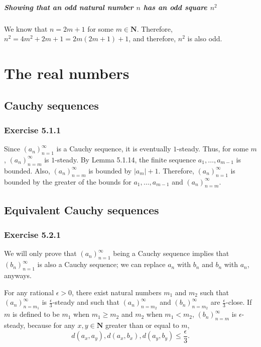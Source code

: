 \documentclass[12pt, oneside]{book}
\begin{document}
	\paragraph*{Showing that an odd natural number $n$ has an odd square $n^2$}

	We know that $n = 2m + 1$ for some $m \in \mathbf{N}$. Therefore, $n^2 = 4m^2 + 2m + 1 = 2m(2m + 1) + 1$, and therefore, $n^2$ is also odd.

	\chapter{The real numbers}

	\section{Cauchy sequences}

	\subsection*{Exercise 5.1.1}

	Since $(a_n)_{n = 1}^\infty$ is a Cauchy sequence, it is eventually $1$-steady. Thus, for some $m$, $(a_n)_{n = m}^\infty$ is $1$-steady. By Lemma 5.1.14, the finite sequence $a_1, \dotsc, a_{m - 1}$ is bounded. Also, $(a_n)_{n = m}^\infty$ is bounded by $|a_m| + 1$. Therefore, $(a_n)_{n = 1}^\infty$ is bounded by the greater of the bounds for $a_1, \dotsc, a_{m - 1}$ and $(a_n)_{n = m}^\infty$.

	\section{Equivalent Cauchy sequences}

	\subsection*{Exercise 5.2.1}

	We will only prove that $(a_n)_{n = 1}^\infty$ being a Cauchy sequence implies that $(b_n)_{n = 1}^\infty$ is also a Cauchy sequence; we can replace $a_n$ with $b_n$ and $b_n$ with $a_n$, anyways.

	For any rational $\epsilon > 0$, there exist natural numbers $m_1$ and $m_2$ such that $(a_n)_{n = m_1}^\infty$ is $\frac{\epsilon}{3}$-steady and such that $(a_n)_{n = m_2}^\infty$ and $(b_n)_{n = m_2}^\infty$ are $\frac{\epsilon}{3}$-close. If $m$ is defined to be $m_1$ when $m_1 \ge m_2$ and $m_2$ when $m_1 < m_2$, $(b_n)_{n = m}^\infty$ is $\epsilon$-steady, because for any $x, y \in \mathbf{N}$ greater than or equal to $m$,
	\[d(a_x, a_y), d(a_x, b_x), d(a_y, b_y) \le \frac{\epsilon}{3}.\]
\end{document}

